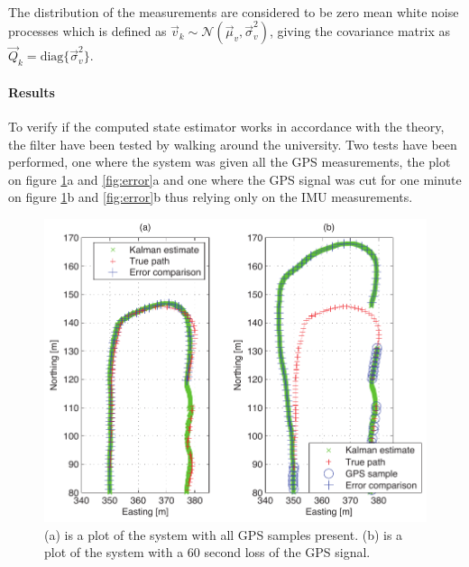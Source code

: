 \documentclass[a0,portrait]{a0poster}
\begin{document}
\begin{center}
{\paragraph{}
The distribution of the measurements are considered to be zero mean white noise processes which is defined as $\vec{v}_k \sim \mathcal{N}(\vec{\mu}_v,\vec{\sigma}^2_v)$, giving the covariance matrix as $\vec{Q}_k = \text{diag}\{\vec{\sigma}^2_v\}$. 

\paragraph{Results}
To verify if the computed state estimator works in accordance with the theory, the filter have been tested by walking around the university. Two tests have been performed, one where the system was given all the GPS measurements, the plot on figure \ref{fig:path}a and \ref{fig:error}a and one where the GPS signal was cut for one minute on figure \ref{fig:path}b and \ref{fig:error}b thus relying only on the IMU measurements.
\begin{figure}
	\centering %
	\includegraphics[width=\threecolwidth]{img/track}
  	\caption{(a) is a plot of the system with all GPS samples present. (b) is a plot of the system with a 60 second loss of the GPS signal.}
	\label{fig:path}
\end{figure}
\begin{figure}
	\centering %

\end{figure}}
\end{center}
\end{document}
